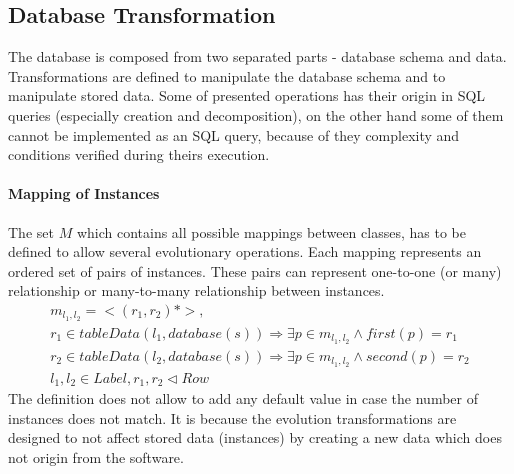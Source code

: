 \documentclass[11pt]{article}
\begin{document}
\subsection{Database Transformation}
The database is composed from two separated parts - database schema and data. Transformations are defined to manipulate the database schema and to manipulate stored data. Some of presented operations has their origin in SQL queries (especially creation and decomposition), on the other hand some of them cannot be implemented as an SQL query, because of they complexity and conditions verified during theirs execution.

\paragraph{Mapping of Instances} The set $M$ which contains all possible mappings between classes, has to be defined to allow several evolutionary operations. Each mapping represents an ordered set of pairs of instances. These pairs can represent one-to-one (or many) relationship or many-to-many relationship between instances.
\begin{align*}
	m_{l_1, l_2} =  <(r_1, r_2)*>,\\
	r_1 \in tableData(l_1, database(s)) \Rightarrow \exists p \in m_{l_1, l_2} \wedge first(p) = r_1 \\
	r_2 \in tableData(l_2, database(s)) \Rightarrow \exists p \in m_{l_1, l_2} \wedge second(p) = r_2\\
	l_1, l_2 \in Label, r_1, r_2 \lhd Row
\end{align*}
The definition does not allow to add any default value in case the number of instances does not match. It is because the evolution transformations are designed to not affect stored data (instances) by creating a new data which does not origin from the software.


\end{document}
